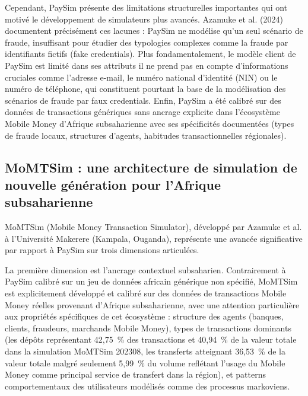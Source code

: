 \documentclass[11pt,a4paper,oneside]{report}
\theoremstyle{definition}
\theoremstyle{remark}
\begin{document}
Cependant, PaySim présente des limitations structurelles importantes qui ont motivé le développement de simulateurs plus avancés. Azamuke et al. (2024) documentent précisément ces lacunes : PaySim ne modélise qu'un seul scénario de fraude, insuffisant pour étudier des typologies complexes comme la fraude par identifiants fictifs (fake credentials). Plus fondamentalement, le modèle client de PaySim est limité dans ses attributs  il ne prend pas en compte d'informations cruciales comme l'adresse e-mail, le numéro national d'identité (NIN) ou le numéro de téléphone, qui constituent pourtant la base de la modélisation des scénarios de fraude par faux credentials. Enfin, PaySim a été calibré sur des données de transactions génériques sans ancrage explicite dans l'écosystème Mobile Money d'Afrique subsaharienne avec ses spécificités documentées (types de fraude locaux, structures d'agents, habitudes transactionnelles régionales).

\subsection{MoMTSim : une architecture de simulation de nouvelle génération pour l'Afrique subsaharienne}

MoMTSim (Mobile Money Transaction Simulator), développé par Azamuke et al. à l'Université Makerere (Kampala, Ouganda), représente une avancée significative par rapport à PaySim sur trois dimensions articulées.

La première dimension est l'ancrage contextuel subsaharien. Contrairement à PaySim calibré sur un jeu de données africain générique non spécifié, MoMTSim est explicitement développé et calibré sur des données de transactions Mobile Money réelles provenant d'Afrique subsaharienne, avec une attention particulière aux propriétés spécifiques de cet écosystème : structure des agents (banques, clients, fraudeurs, marchands Mobile Money), types de transactions dominants (les dépôts représentant 42,75~\% des transactions et 40,94~\% de la valeur totale dans la simulation MoMTSim 202308, les transferts atteignant 36,53~\% de la valeur totale malgré seulement 5,99~\% du volume  reflétant l'usage du Mobile Money comme principal service de transfert dans la région), et patterns comportementaux des utilisateurs modélisés comme des processus markoviens.
\end{document}
